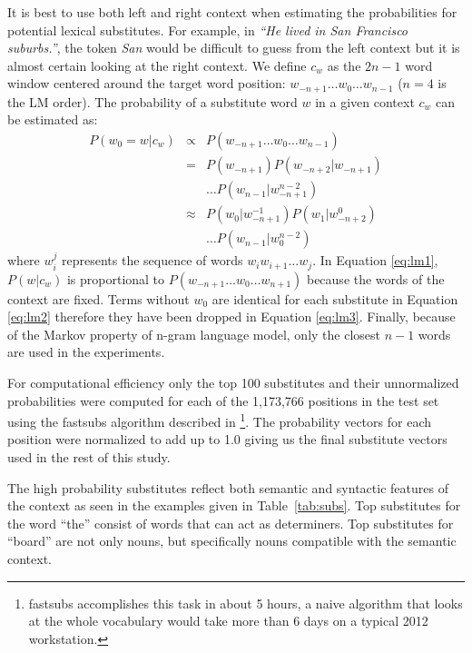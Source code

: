 \documentclass[11pt]{article}
\begin{document}
It is best to use both left and right context when estimating the
probabilities for potential lexical substitutes.  For example, in
\emph{``He lived in San Francisco suburbs.''}, the token \emph{San}
would be difficult to guess from the left context but it is almost
certain looking at the right context.  We define $c_w$ as the $2n-1$
word window centered around the target word position: $w_{-n+1} \ldots
w_0 \ldots w_{n-1}$ ($n=4$ is the LM order).  The probability of a
substitute word $w$ in a given context $c_w$ can be estimated as:
\begin{eqnarray}
  \label{eq:lm1}P(w_0 = w | c_w) & \propto & P(w_{-n+1}\ldots w_0\ldots w_{n-1})\\
  \label{eq:lm2}& = & P(w_{-n+1})P(w_{-n+2}|w_{-n+1})\nonumber\\
  &&\ldots P(w_{n-1}|w_{-n+1}^{n-2})\\
  \label{eq:lm3}& \approx & P(w_0| w_{-n+1}^{-1})P(w_{1}|w_{-n+2}^0)\nonumber\\
  &&\ldots P(w_{n-1}|w_0^{n-2})
\end{eqnarray}
where $w_i^j$ represents the sequence of words $w_i w_{i+1} \ldots
w_{j}$.  In Equation \ref{eq:lm1}, $P(w|c_w)$ is proportional to
$P(w_{-n+1}\ldots w_0 \ldots w_{n+1})$ because the words of the
context are fixed.  Terms without $w_0$ are identical for each
substitute in Equation \ref{eq:lm2} therefore they have been dropped
in Equation \ref{eq:lm3}.  Finally, because of the Markov property of
n-gram language model, only the closest $n-1$ words are used in the
experiments.

For computational efficiency only the top 100 substitutes and their
unnormalized probabilities were computed for each of the 1,173,766
positions in the test set using the {\sc fastsubs} algorithm described
in \cite{selfcitation}\footnote{{\sc fastsubs} accomplishes this task
  in about 5 hours, a naive algorithm that looks at the whole
  vocabulary would take more than 6 days on a typical 2012
  workstation.}.  The probability vectors for each position were
normalized to add up to 1.0 giving us the final substitute vectors
used in the rest of this study.

The high probability substitutes reflect both semantic and syntactic
features of the context as seen in the examples given in
Table~\ref{tab:subs}.  Top substitutes for the word ``the'' consist of
words that can act as determiners.  Top substitutes for ``board'' are
not only nouns, but specifically nouns compatible with the semantic
context.
\end{document}
